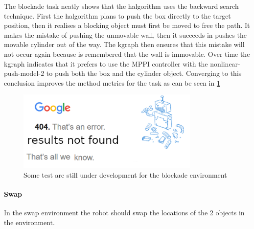 The blockade task neatly shows that the \ac{halgorithm} uses the backward search technique. First the \ac{halgorithm} plans to push the box directly to the target position, then it realises a blocking object must first be moved to free the path. It makes the mistake of pushing the unmovable wall, then it succeeds in pushes the movable cylinder out of the way. The \ac{kgraph} then ensures that this mistake will not occur again because is remembered that the wall is immovable. Over time the \ac{kgraph} indicates that it prefers to use the \ac{MPPI} controller with the nonlinear-push-model-2 to push both the box and the cylinder object. Converging to this conclusion improves the method metrics for the task as can be seen in \cref{fig:results_blockade}\bs


\begin{figure}[H]
    \centering
    \includegraphics[width=9cm]{figures/tests/404_not_found}

    \caption{Some test are still under development for the blockade environment}%
    \label{fig:results_blockade}
\end{figure}

\paragraph{Swap}
In the swap environment the robot should swap the locations of the 2 objects in the environment.\bs

